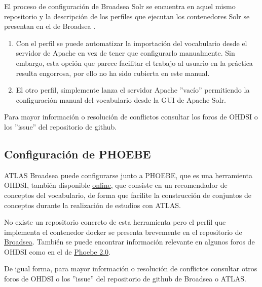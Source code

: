 El proceso de configuración de Broadsea Solr se encuentra en aquel mismo repositorio y la descripción de los perfiles que ejecutan los contenedores Solr se presentan en el de Broadsea \cite{githubBroadsea}. 

\begin{enumerate}
    \item Con el perfil  se puede automatizar la importación del vocabulario desde el servidor de Apache en vez de tener que configurarlo manualmente. Sin embargo, esta opción que parece facilitar el trabajo al usuario en la práctica resulta engorrosa, por ello no ha sido cubierta en este manual.
    \item El otro perfil,  simplemente lanza el servidor Apache ''vacío'' permitiendo la configuración manual del vocabulario desde la GUI de Apache Solr.
\end{enumerate}

Para mayor información o resolución de conflictos consultar los foros de OHDSI o los ''issue'' del repositorio de github.

\subsection{Configuración de PHOEBE}

ATLAS Broadsea puede configurarse junto a PHOEBE, que es una herramienta OHDSI, también disponible \href{https://data.ohdsi.org/PHOEBE/}{online}, que consiste en un recomendador de conceptos del vocabulario, de forma que facilite la construcción de conjuntos de conceptos durante la realización de estudios con ATLAS. 

No existe un repositorio concreto de esta herramienta pero el perfil que implementa el contenedor docker se presenta brevemente en el repositorio de \href{https://github.com/OHDSI/Broadsea}{Broadsea}. También se puede encontrar información relevante en algunos foros de OHDSI como en el de \href{https://forums.ohdsi.org/t/phoebe-2-0/17410}{Phoebe 2.0}.

De igual forma, para mayor información o resolución de conflictos consultar otros foros de OHDSI o los ''issue'' del repositorio de github de Broadsea o ATLAS.
